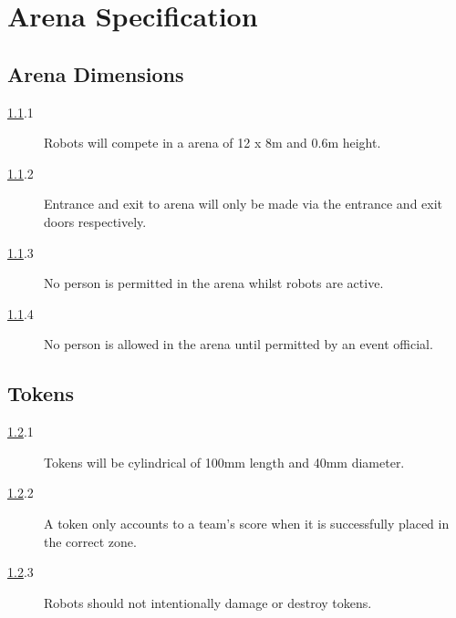 \section {Arena Specification}

\subsection {Arena Dimensions}
\label{arena}

\begin {description}
\item [\ref{arena}.1] Robots will compete in a arena of 12 x 8m and 0.6m height.
\item [\ref{arena}.2] Entrance and exit to arena will only be made via the entrance and exit doors respectively.
\item [\ref{arena}.3] No person is permitted in the arena whilst robots are active.
\item [\ref{arena}.4] No person is allowed in the arena until permitted by an event official.
\end {description}

\subsection {Tokens}
\label{tokens}

\begin {description} 
\item [\ref{tokens}.1] Tokens will be cylindrical of 100mm length and 40mm diameter.
\item [\ref{tokens}.2] A token only accounts to a team's score when it is successfully placed in the correct zone.
\item [\ref{tokens}.3] Robots should not intentionally damage or destroy tokens.
\end {description}

